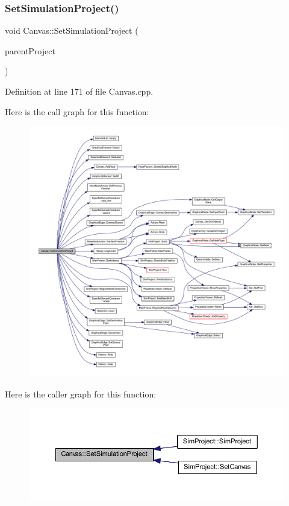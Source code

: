 \subsubsection{\texorpdfstring{Set\+Simulation\+Project()}{SetSimulationProject()}}
{\footnotesize\ttfamily void Canvas\+::\+Set\+Simulation\+Project (\begin{DoxyParamCaption}\item[{\hyperlink{class_sim_project}{Sim\+Project} $\ast$}]{parent\+Project }\end{DoxyParamCaption})}



Definition at line 171 of file Canvas.\+cpp.

Here is the call graph for this function\+:
\nopagebreak
\begin{figure}[H]
\begin{center}
\leavevmode
\includegraphics[width=350pt]{class_canvas_ae7b17a82b7376ee4105b8f36179ab90e_cgraph}
\end{center}
\end{figure}
Here is the caller graph for this function\+:
\nopagebreak
\begin{figure}[H]
\begin{center}
\leavevmode
\includegraphics[width=350pt]{class_canvas_ae7b17a82b7376ee4105b8f36179ab90e_icgraph}
\end{center}
\end{figure}
\mbox{\label{class_canvas_a4afa0e24da7b82be3696131c13d89404}} 
